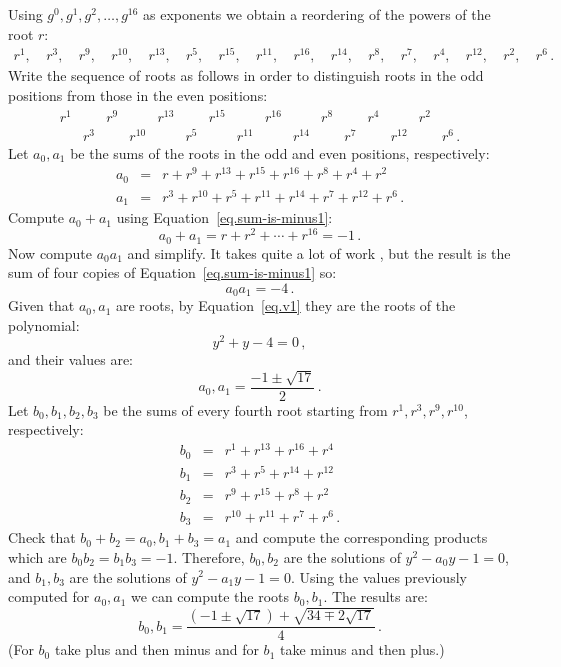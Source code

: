 \documentclass[a4paper,11pt]{article}
\begin{document}
Using $g^0,g^1,g^2,\ldots, g^{16}$ as exponents we obtain a reordering of the powers of the root $r$:
\[
\begin{array}{rrrrrrrrrrrrrrrr}
r^1,\:& r^3,\:& r^9,\:& r^{10},\:& r^{13},\:& r^5,\:& r^{15},\:& r^{11},\:& r^{16},\:& r^{14},\:& r^8,\:& r^7,\:& r^4,\:& r^{12},\:& r^2,\:& r^6\,.
\end{array}
\]
Write the sequence of roots as follows in order to distinguish roots in the odd positions from those in the even positions:
\[
\begin{array}{rrrrrrrrrrrrrrrr}
r^1 &&  r^9 &&  r^{13} && r^{15} &&  r^{16} && r^8 && r^4 && r^2\\\
&r^3&& r^{10}&& r^5&& r^{11}&& r^{14} &&  r^7&& r^{12}&& r^6\,.
\end{array}
\]
Let $a_0, a_1$ be the sums of the roots in the odd and even positions, respectively:
\begin{eqnarray*}
a_0&=&r + r^9 + r^{13} +r^{15} +r^{16} + r^8+r^4+r^2\\
a_1&=&r^3 + r^{10} + r^{5} +r^{11} +r^{14} + r^7+r^{12}+r^6\,.
\end{eqnarray*}
Compute $a_0+a_1$ using Equation~\ref{eq.sum-is-minus1}:
\[
a_0+a_1=r + r^2 + \cdots +r^{16}=-1\,.
\]
Now compute $a_0a_1$ and simplify. It takes quite a lot of work \cite[Section~16.4]{surprises}, but the result is the sum of four copies of Equation~\ref{eq.sum-is-minus1} so:
\[
a_0a_1=-4\,.
\]
Given that $a_0,a_1$ are roots, by Equation~\ref{eq.v1} they are the roots of the polynomial:
\[
y^2+y-4=0\,,
\]
and their values are:
\[
a_0, a_1 = \frac{-1\pm\sqrt{17}}{2}\,.
\]
Let $b_0,b_1,b_2,b_3$ be the sums of every fourth root starting from $r^1,r^3,r^9,r^{10}$, respectively:
\begin{eqnarray*}
b_0&=& r^1+ r^{13} + r^{16} + r^4\\
b_1&=& r^3+ r^{5} + r^{14} + r^{12}\\
b_2&=& r^9+ r^{15} + r^{8} + r^2\\
b_3&=& r^{10}+ r^{11} + r^{7} + r^6\,.
\end{eqnarray*}
Check that $b_0+b_2=a_0, b_1+b_3=a_1$ and compute the corresponding products which are $b_0b_2=b_1b_3=-1$. Therefore, $b_0,b_2$ are the solutions of $y^2-a_0y-1= 0$, and $b_1,b_3$ are the solutions of $y^2-a_1y-1 =0$. Using the values previously computed for $a_0,a_1$ we can compute the roots $b_0,b_1$. The results are:
\[
b_0, b_1 =\frac{(-1\pm\sqrt{17}) + \sqrt{34\mp2\sqrt{17}}}{4}\,.
\]
(For $b_0$ take plus and then minus and for $b_1$ take minus and then plus.)
\end{document}
